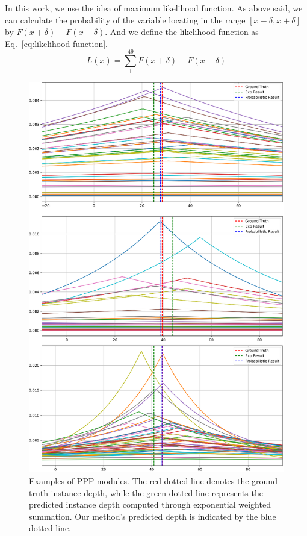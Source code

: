 \documentclass[journal]{IEEEtran}
\begin{document}
		In this work, we use the idea of maximum likelihood function. As above said, we can calculate the probability of the variable locating in the range $[x-\delta, x+\delta]$ by $F(x+\delta)-F(x-\delta)$. And we define the likelihood function as Eq.~\eqref{eq:likelihood function}. 
		\begin{equation}
			L(x) = \sum_{1}^{49} F(x+\delta)-F(x-\delta)
			\label{eq:likelihood function}
		\end{equation}
	
		\begin{figure}[!t]
			\centering
			\includegraphics[width=1.0\linewidth]{Figures/ppp_result/ppp.eps}
			\caption{Examples of PPP modules. The red dotted line denotes the ground truth instance depth, while the green dotted line represents the predicted instance depth computed through exponential weighted summation. Our method's predicted depth is indicated by the blue dotted line.}
			\label{fig:ppp}
		\end{figure}
		
\end{document}
